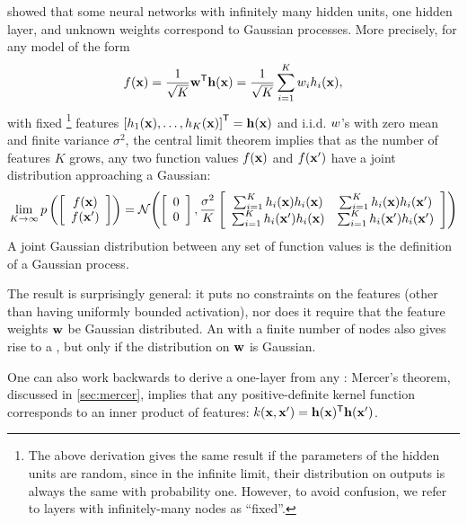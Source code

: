 \citet[chapter 2]{neal1995bayesian} showed that some neural networks with infinitely many hidden units, one hidden layer, and unknown weights correspond to Gaussian processes.
More precisely, for any model of the form
%
\begin{align}
f({\bf{x}}) = \frac{1}{\sqrt{K}}{\mathbf {{\bf{w}}}}^{\mathsf{T}} {\bf{h}}({\bf{x}}) = \frac{1}{\sqrt{K}} \sum_{i=1}^K w_i h_i({\bf{x}}),
\label{eq:one-layer-gp}
\end{align}
%
with fixed%
\footnote{The above derivation gives the same result if the parameters of the hidden units are random, since in the infinite limit, their distribution on outputs is always the same with probability one.
However, to avoid confusion, we refer to layers with infinitely-many nodes as ``fixed''.
}
 features $\left[ h_1({\bf{x}}), \dots, h_K({\bf{x}}) \right]^{\mathsf{T}} = {\bf{h}}({\bf{x}})$ and i.i.d. $w$'s with zero mean and finite variance $\sigma^2$, the central limit theorem implies that as the number of features $K$ grows, any two function values $f({\bf{x}})$ and $f({\bf{x}}')$ have a joint distribution approaching a Gaussian:
%
\begin{align}
\lim_{K \to \infty} p\left( \left[ \begin{array}{c} {f({\bf{x}})} \\ {f({\bf{x}}')} \end{array} \right] \right) = \mathcal{N}\!\left(\left[ \begin{array}{c} {0} \\ {0} \end{array} \right],
\frac{\sigma^2}{K} \left[ \begin{array}{cc}
\sum_{i=1}^K h_i({\bf{x}})h_i({\bf{x}}) &
\sum_{i=1}^K h_i({\bf{x}})h_i({\bf{x}}') \\
\sum_{i=1}^K h_i({\bf{x}}')h_i({\bf{x}}) &
\sum_{i=1}^K h_i({\bf{x}}')h_i({\bf{x}}')
\end{array} \right] \right)
\end{align}
A joint Gaussian distribution between any set of function values is the definition of a Gaussian process.

The result is surprisingly general:
it puts no constraints on the features (other than having uniformly bounded activation), nor does it require that the feature weights ${\bf{w}}$ be Gaussian distributed.  
An \MLP{} with a finite number of nodes also gives rise to a \gp{}, but only if the distribution on ${\bf{w}}$ is Gaussian.


One can also work backwards to derive a one-layer \MLP{} from any \gp{}:
Mercer's theorem, discussed in \cref{sec:mercer}, implies that any positive-definite kernel function corresponds to an inner product of features: $k({\bf{x}}, {\bf{x}}') = {\bf{h}}({\bf{x}}) ^{\mathsf{T}} {\bf{h}}({\bf{x}}')$.

